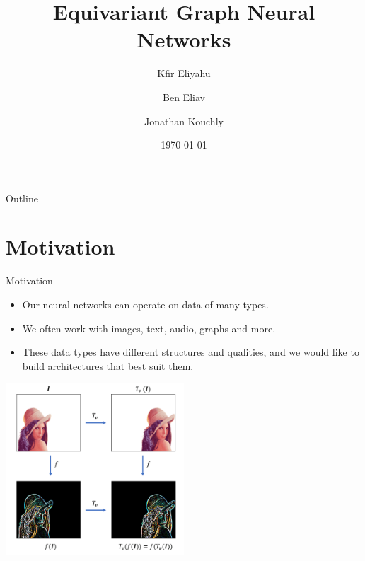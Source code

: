 \documentclass{beamer}
\title[Equivariant Graph Neural Networks]{Equivariant Graph Neural Networks}
\author[Kfir Eliyahu, Ben Eliav, Jonathan Kouchly]{Kfir Eliyahu \and Ben Eliav \and Jonathan Kouchly}
\date{\today} %
\begin{document}
\begin{frame}
    \titlepage
\end{frame}

\begin{frame}{Outline}
    \tableofcontents
\end{frame}


\section{Motivation}




\begin{frame}{Motivation}
\begin{itemize}
    \setlength{\itemsep}{\fill}
    \item Our neural networks can operate on data of many types.
    \item We often work with images, text, audio, graphs and more.
    \item These data types have different structures and qualities, and we would like to build architectures that best suit them.
    \end{itemize}
    \begin{center}
        \includegraphics[width=0.5\textwidth]{../figures/equivariance.png}
    \end{center}
\end{frame}
\end{document}

